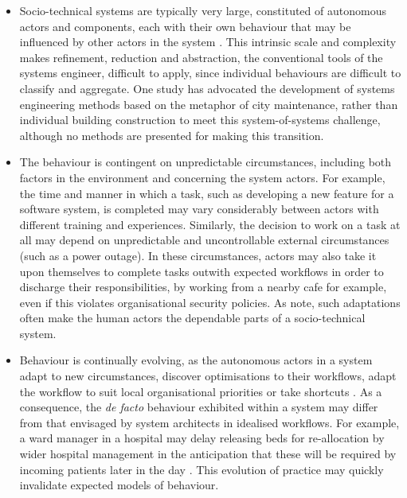 \documentclass{sig-alternate}
\begin{document}
\begin{itemize}

\item Socio-technical systems are typically very large, constituted of autonomous actors and components, each with their
  own behaviour that may be influenced by other actors in the system \cite{crabtree00ethnomethodologically}.  This
  intrinsic scale and complexity makes refinement, reduction and abstraction, the conventional tools of the systems
  engineer, difficult to apply, since individual behaviours are difficult to classify and aggregate.  One study has
  advocated the development of systems engineering methods based on the metaphor of city maintenance, rather than
  individual building construction \citep{feiler06ultra} to meet this system-of-systems challenge, although no methods
  are presented for making this transition.

\item The behaviour is contingent on unpredictable circumstances, including both factors in the environment and
  concerning the system actors.  For example, the time and manner in which a task, such as developing a new feature for
  a software system, is completed may vary considerably between actors with different training and experiences.
  Similarly, the decision to work on a task at all may depend on unpredictable and uncontrollable external circumstances
  (such as a power outage).  In these circumstances, actors may also take it upon themselves to complete tasks outwith
  expected workflows in order to discharge their responsibilities, by working from a nearby cafe for example, even if
  this violates organisational security policies.  As \citet{besnard03human} note, such adaptations often make the human
  actors the dependable parts of a socio-technical system.

\item Behaviour is continually evolving, as the autonomous actors in a system adapt to new circumstances, discover
  optimisations to their workflows, adapt the workflow to suit local organisational priorities or take shortcuts
  \citep{bonen79evolutionary,Lyytinen2008,anderson04heterogeneous}.  As a consequence, the \emph{de facto} behaviour
  exhibited within a system may differ from that envisaged by system architects in idealised workflows.  For example, a
  ward manager in a hospital may delay releasing beds for re-allocation by wider hospital management in the anticipation
  that these will be required by incoming patients later in the day \citep{dewsbury07responsibility}.  This evolution of
  practice may quickly invalidate expected models of behaviour.

\end{itemize}
\end{document}
